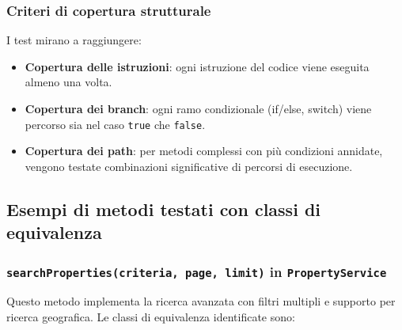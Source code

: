 \documentclass[a4paper,11pt]{report}
\begin{document}
\subsubsection*{Criteri di copertura strutturale}

I test mirano a raggiungere:

\begin{itemize}[nosep]
  \item \textbf{Copertura delle istruzioni}: ogni istruzione del codice viene eseguita almeno una volta.
  \item \textbf{Copertura dei branch}: ogni ramo condizionale (if/else, switch) viene percorso sia nel caso \texttt{true} che \texttt{false}.
  \item \textbf{Copertura dei path}: per metodi complessi con più condizioni annidate, vengono testate combinazioni significative di percorsi di esecuzione.
\end{itemize}

\subsection{Esempi di metodi testati con classi di equivalenza}

\subsubsection*{\texttt{searchProperties(criteria, page, limit)} in \texttt{PropertyService}}

Questo metodo implementa la ricerca avanzata con filtri multipli e supporto per ricerca geografica. Le classi di equivalenza identificate sono:
\end{document}
